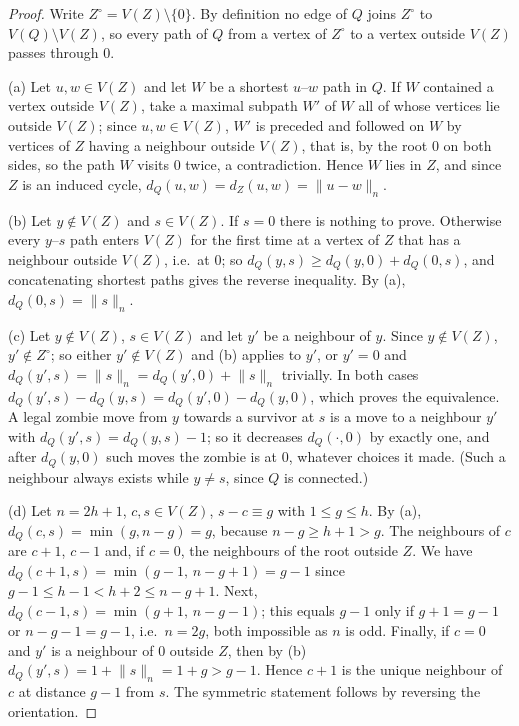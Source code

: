 \documentclass[11pt,a4paper]{article}
\theoremstyle{plain}
\theoremstyle{definition}
\theoremstyle{remark}
\newcommand{\cyc}[2]{\lVert #1\rVert_{#2}}
\newcommand{\dist}{d}
\begin{document}
\label{pf:dist}
\lemdist*
\begin{proof}
Write $Z^\circ=V(Z)\setminus\{0\}$. By definition no edge of $Q$ joins $Z^\circ$ to $V(Q)\setminus V(Z)$, so every path of $Q$ from a vertex of $Z^\circ$ to a vertex outside $V(Z)$ passes through $0$.

(a) Let $u,w\in V(Z)$ and let $W$ be a shortest $u$--$w$ path in $Q$. If $W$ contained a vertex outside $V(Z)$, take a maximal subpath $W'$ of $W$ all of whose vertices lie outside $V(Z)$; since $u,w\in V(Z)$, $W'$ is preceded and followed on $W$ by vertices of $Z$ having a neighbour outside $V(Z)$, that is, by the root $0$ on both sides, so the path $W$ visits $0$ twice, a contradiction. Hence $W$ lies in $Z$, and since $Z$ is an induced cycle, $\dist_Q(u,w)=\dist_Z(u,w)=\cyc{u-w}{n}$.

(b) Let $y\notin V(Z)$ and $s\in V(Z)$. If $s=0$ there is nothing to prove. Otherwise every $y$--$s$ path enters $V(Z)$ for the first time at a vertex of $Z$ that has a neighbour outside $V(Z)$, i.e.\ at $0$; so $\dist_Q(y,s)\ge\dist_Q(y,0)+\dist_Q(0,s)$, and concatenating shortest paths gives the reverse inequality. By (a), $\dist_Q(0,s)=\cyc{s}{n}$.

(c) Let $y\notin V(Z)$, $s\in V(Z)$ and let $y'$ be a neighbour of $y$. Since $y\notin V(Z)$, $y'\notin Z^\circ$; so either $y'\notin V(Z)$ and (b) applies to $y'$, or $y'=0$ and $\dist_Q(y',s)=\cyc{s}{n}=\dist_Q(y',0)+\cyc{s}{n}$ trivially. In both cases $\dist_Q(y',s)-\dist_Q(y,s)=\dist_Q(y',0)-\dist_Q(y,0)$, which proves the equivalence. A legal zombie move from $y$ towards a survivor at $s$ is a move to a neighbour $y'$ with $\dist_Q(y',s)=\dist_Q(y,s)-1$; so it decreases $\dist_Q(\cdot,0)$ by exactly one, and after $\dist_Q(y,0)$ such moves the zombie is at $0$, whatever choices it made. (Such a neighbour always exists while $y\ne s$, since $Q$ is connected.)

(d) Let $n=2h+1$, $c,s\in V(Z)$, $s-c\equiv g$ with $1\le g\le h$. By (a), $\dist_Q(c,s)=\min(g,n-g)=g$, because $n-g\ge h+1>g$. The neighbours of $c$ are $c+1$, $c-1$ and, if $c=0$, the neighbours of the root outside $Z$. We have $\dist_Q(c+1,s)=\min(g-1,\,n-g+1)=g-1$ since $g-1\le h-1<h+2\le n-g+1$. Next, $\dist_Q(c-1,s)=\min(g+1,\,n-g-1)$; this equals $g-1$ only if $g+1=g-1$ or $n-g-1=g-1$, i.e.\ $n=2g$, both impossible as $n$ is odd. Finally, if $c=0$ and $y'$ is a neighbour of $0$ outside $Z$, then by (b) $\dist_Q(y',s)=1+\cyc{s}{n}=1+g>g-1$. Hence $c+1$ is the unique neighbour of $c$ at distance $g-1$ from $s$. The symmetric statement follows by reversing the orientation.
\end{proof}
\end{document}
